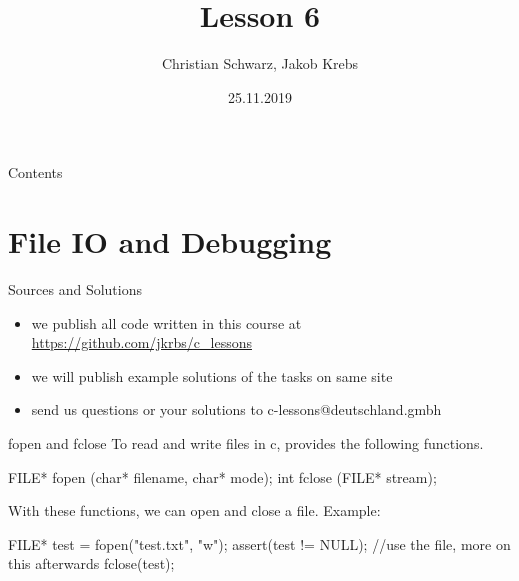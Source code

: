 \documentclass[10pt,graphics,aspectratio=169,table]{beamer}
\title{Lesson 6}
\author{Christian Schwarz, Jakob Krebs}
\date{25.11.2019}
\begin{document}
\maketitle

\begin{frame}{Contents}
    \tableofcontents
\end{frame}


\section{File IO and Debugging}
\begin{frame}{Sources and Solutions}
    \begin{itemize}
        \item we publish all code written in this course at \url{https://github.com/jkrbs/c_lessons}
        \item we will publish example solutions of the tasks on same site
        \item send us questions or your solutions to c-lessons@deutschland.gmbh
    \end{itemize}
\end{frame}

\begin{frame}[fragile]{fopen and fclose}
    To read and write files in c, 
    provides the following functions.

    \begin{codeblock}
FILE* fopen (char* filename, char* mode);
int fclose (FILE* stream);
    \end{codeblock}

    With these functions, we can open and close a file. 
    Example:

    \begin{codeblock}
FILE* test = fopen("test.txt", "w");
assert(test != NULL);
//use the file, more on this afterwards
fclose(test);
    \end{codeblock}
\end{frame}
    
\end{document}
